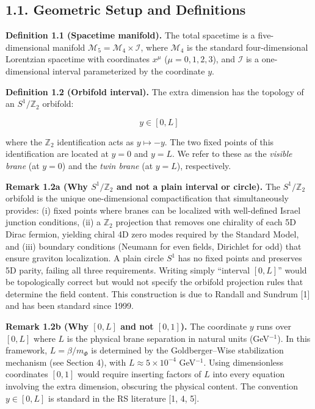 \documentclass[
  11pt,
]{article}
\begin{document}
\bigskip

\hypertarget{geometric-setup-and-definitions}{%
\subsection{1.1. Geometric Setup and
Definitions}\label{geometric-setup-and-definitions}}

\textbf{Definition 1.1 (Spacetime manifold).} The total spacetime is a
five-dimensional manifold
\(\mathcal{M}_5 = \mathcal{M}_4 \times \mathcal{I}\), where
\(\mathcal{M}_4\) is the standard four-dimensional Lorentzian spacetime
with coordinates \(x^\mu\) (\(\mu = 0,1,2,3\)), and \(\mathcal{I}\) is a
one-dimensional interval parameterized by the coordinate \(y\).

\textbf{Definition 1.2 (Orbifold interval).} The extra dimension has the
topology of an \(S^1/\mathbb{Z}_2\) orbifold:

\[y \in [0, L] \tag{4}\]

where the \(\mathbb{Z}_2\) identification acts as \(y \mapsto -y\). The
two fixed points of this identification are located at \(y = 0\) and
\(y = L\). We refer to these as the \emph{visible brane} (at \(y = 0\))
and the \emph{twin brane} (at \(y = L\)), respectively.

\textbf{Remark 1.2a (Why \(S^1/\mathbb{Z}_2\) and not a plain interval
or circle).} The \(S^1/\mathbb{Z}_2\) orbifold is the unique
one-dimensional compactification that simultaneously provides: (i) fixed
points where branes can be localized with well-defined Israel junction
conditions, (ii) a \(\mathbb{Z}_2\) projection that removes one
chirality of each 5D Dirac fermion, yielding chiral 4D zero modes
required by the Standard Model, and (iii) boundary conditions (Neumann
for even fields, Dirichlet for odd) that ensure graviton localization. A
plain circle \(S^1\) has no fixed points and preserves 5D parity,
failing all three requirements. Writing simply ``interval \([0,L]\)''
would be topologically correct but would not specify the orbifold
projection rules that determine the field content. This construction is
due to Randall and Sundrum {[}1{]} and has been standard since 1999.

\textbf{Remark 1.2b (Why \([0, L]\) and not \([0, 1]\)).} The coordinate
\(y\) runs over \([0, L]\) where \(L\) is the physical brane separation
in natural units (GeV\(^{-1}\)). In this framework, \(L = \beta/m_\Phi\)
is determined by the Goldberger--Wise stabilization mechanism (see
Section 4), with \(L \approx 5 \times 10^{-4}\) GeV\(^{-1}\). Using
dimensionless coordinates \([0, 1]\) would require inserting factors of
\(L\) into every equation involving the extra dimension, obscuring the
physical content. The convention \(y \in [0, L]\) is standard in the RS
literature {[}1, 4, 5{]}.
\end{document}

